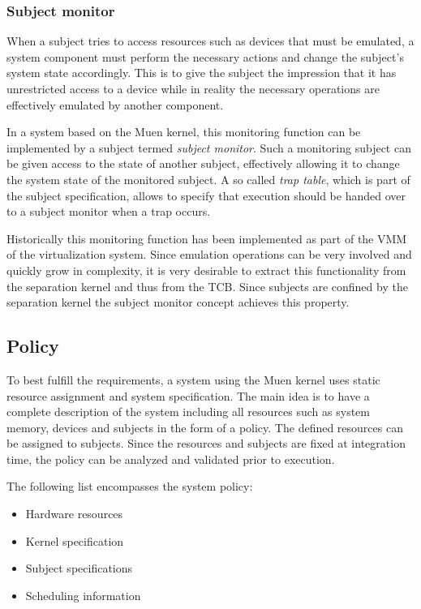 \subsubsection{Subject monitor}
When a subject tries to access resources such as devices that must be emulated,
a system component must perform the necessary actions and change the subject's
system state accordingly. This is to give the subject the impression that it
has unrestricted access to a device while in reality the necessary operations
are effectively emulated by another component.

In a system based on the Muen kernel, this monitoring function can be
implemented by a subject termed \emph{subject monitor}. Such a monitoring
subject can be given access to the state of another subject, effectively
allowing it to change the system state of the monitored subject. A so called
\emph{trap table}, which is part of the subject specification, allows to
specify that execution should be handed over to a subject monitor when a trap
occurs.

Historically this monitoring function has been implemented as part of the VMM
of the virtualization system. Since emulation operations can be very involved
and quickly grow in complexity, it is very desirable to extract this
functionality from the separation kernel and thus from the TCB. Since subjects
are confined by the separation kernel the subject monitor concept achieves this
property.

\subsection{Policy}\label{subsec:policy}
To best fulfill the requirements, a system using the Muen kernel uses static
resource assignment and system specification. The main idea is to have a
complete description of the system including all resources such as system
memory, devices and subjects in the form of a policy. The defined resources can
be assigned to subjects. Since the resources and subjects are fixed at
integration time, the policy can be analyzed and validated prior to execution.

The following list encompasses the system policy:
\begin{itemize}
	\item Hardware resources
	\item Kernel specification
	\item Subject specifications
	\item Scheduling information
\end{itemize}

